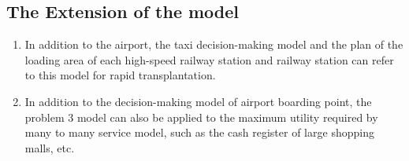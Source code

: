 \subsection{The Extension of the model}
\begin{enumerate}
    \item In addition to the airport, the taxi decision-making model and the plan of the loading area of each high-speed railway station and railway station can refer to this model for rapid transplantation.
    \item In addition to the decision-making model of airport boarding point, the problem 3 model can also be applied to the maximum utility required by many to many service model, such as the cash register of large shopping malls, etc.
\end{enumerate}